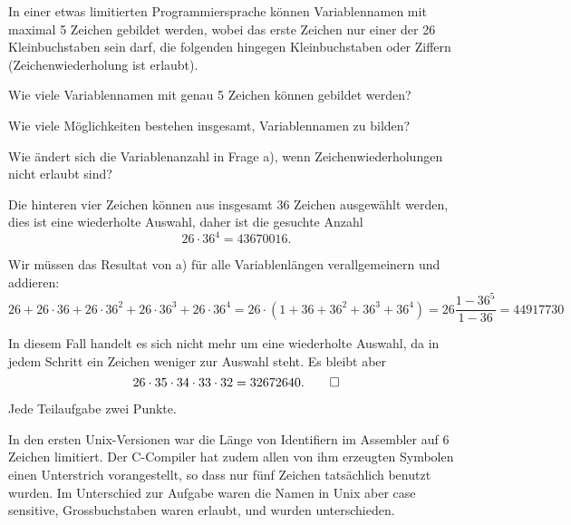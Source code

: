 In einer etwas limitierten Programmiersprache können Variablennamen
mit maximal 5 Zeichen gebildet werden, wobei das erste Zeichen nur
einer der 26 Kleinbuchstaben sein darf, die folgenden hingegen Kleinbuchstaben
oder Ziffern (Zeichenwiederholung ist erlaubt).
\begin{teilaufgaben}
\item
Wie viele Variablennamen mit genau 5 Zeichen können gebildet werden?
\item
Wie viele Möglichkeiten bestehen insgesamt, Variablennamen zu bilden?
\item
Wie ändert sich die Variablenanzahl in Frage a),
wenn Zeichenwiederholungen nicht erlaubt sind?
\end{teilaufgaben}

\begin{loesung}
\begin{teilaufgaben}
\item Die hinteren vier Zeichen können aus insgesamt 36 Zeichen ausgewählt
werden, dies ist eine wiederholte Auswahl, daher ist die gesuchte Anzahl
\[
26\cdot 36^4=43670016.
\]
\item 
Wir müssen das Resultat von a) für alle Variablenlängen verallgemeinern
und addieren:
\[
26
+
26\cdot 36
+
26\cdot 36^2
+
26\cdot 36^3
+
26\cdot 36^4
=
26 \cdot (1 + 36 + 36^2 + 36^3 + 36^4)=26\frac{1-36^5}{1-36}
=
44917730
\]
\item
In diesem Fall handelt es sich nicht mehr um eine wiederholte Auswahl,
da in jedem Schritt ein Zeichen weniger zur Auswahl steht. Es bleibt
aber
\[
26 \cdot 35 \cdot 34 \cdot 33 \cdot 32=32672640.
\qedhere
\]
\end{teilaufgaben}
\end{loesung}

\begin{bewertung}
Jede Teilaufgabe zwei Punkte.
\end{bewertung}

\begin{diskussion}
In den ersten Unix-Versionen war die Länge von Identifiern im Assembler
auf 6 Zeichen limitiert. Der C-Compiler hat zudem allen von ihm 
erzeugten Symbolen einen Unterstrich vorangestellt, so dass nur fünf
Zeichen tatsächlich benutzt wurden. Im Unterschied zur Aufgabe
waren die Namen in Unix aber case sensitive, Grossbuchstaben waren erlaubt,
und wurden unterschieden.
\end{diskussion}

